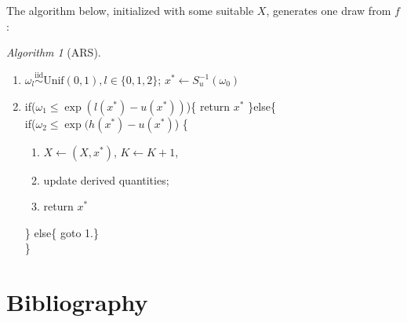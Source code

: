 \documentclass[11pt]{article}
\newcommand{\upperlog}{u}
\newcommand{\cumulproposal}{S}
\newcommand{\arsmaxindex}{K}
\begin{document}
The algorithm below, initialized with some suitable $X$, generates one draw from $f$:
\theoremstyle{remark}
\newtheorem{algorithm}{Algorithm}
\begin{algorithm}[ARS]\label{alg:ARS}
\hfill\par
\begin{enumerate}
\item $\omega_l \stackrel{\mathrm{iid}}{\sim}\mathrm{Unif}(0,1),l\in\{0,1,2\}$; $x^*\leftarrow \cumulproposal_\upperlog^{-1}(\omega_0)$
\item if($\omega_1\leq \exp(l(x^*)-u(x^*))$)\{ return $x^*$ \}else\{\\
 if($\omega_2\leq \exp(h(x^*)-u(x^*)$)
\{ \begin{enumerate}
\item $X\leftarrow (X,x^*)$, $\arsmaxindex\leftarrow \arsmaxindex+1$, \item update derived quantities; \item return $x^*$
\end{enumerate}\}
else\{ goto 1.\}\\
\}
\end{enumerate}
\end{algorithm}


\section*{Bibliography}
\printbibliography[heading=none]
\end{document}
